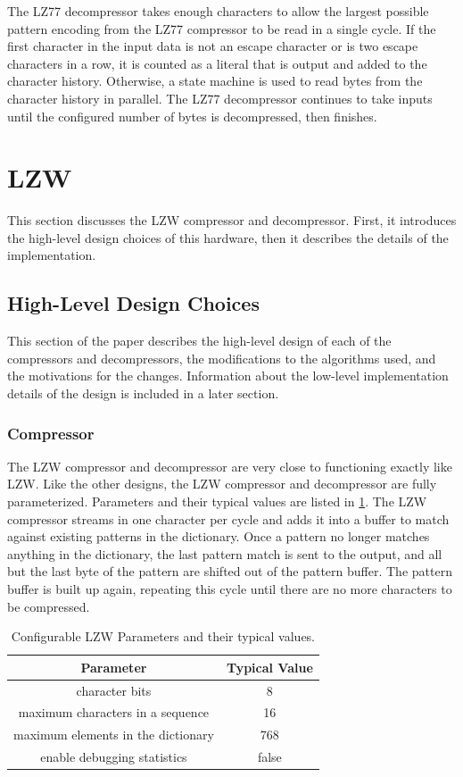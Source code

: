 \documentclass[doublespace,nopageskip]{VTthesis}
\begin{document}
The LZ77 decompressor takes enough characters to allow the largest possible pattern encoding from the LZ77 compressor to be read in a single cycle. If the first character in the input data is not an escape character or is two escape characters in a row, it is counted as a literal that is output and added to the character history. Otherwise, a state machine is used to read bytes from the character history in parallel. The LZ77 decompressor continues to take inputs until the configured number of bytes is decompressed, then finishes.

\section{LZW}\label{ss:lzw}
This section discusses the LZW compressor and decompressor. First, it introduces the high-level design choices of this hardware, then it describes the details of the implementation.

\subsection{High-Level Design Choices}\label{se:high-level_design_choices}
This section of the paper describes the high-level design of each of the compressors and decompressors, the modifications to the algorithms used, and the motivations for the changes. Information about the low-level implementation details of the design is included in a later section.

\subsubsection{Compressor}\label{sss:lzw_compressor_design}
The LZW compressor and decompressor are very close to functioning exactly like LZW. Like the other designs, the LZW compressor and decompressor are fully parameterized. Parameters and their typical values are listed in \ref{tab:lzw-configuration-table}. The LZW compressor streams in one character per cycle and adds it into a buffer to match against existing patterns in the dictionary. Once a pattern no longer matches anything in the dictionary, the last pattern match is sent to the output, and all but the last byte of the pattern are shifted out of the pattern buffer. The pattern buffer is built up again, repeating this cycle until there are no more characters to be compressed.

\begin{table}[htb]
	\centering
	\caption{Configurable LZW Parameters and their typical values.}
	\begin{tabular}{cc}
	    \toprule
	    Parameter & Typical Value \\
	    \midrule
	    character bits & 8 \\
	    \midrule
	    maximum characters in a sequence & 16 \\
	    \midrule
	    maximum elements in the dictionary & 768 \\ 
	    \midrule
	    enable debugging statistics & false \\
	    \bottomrule
	\end{tabular}
	\label{tab:lzw-configuration-table}
\end{table}
\end{document}
